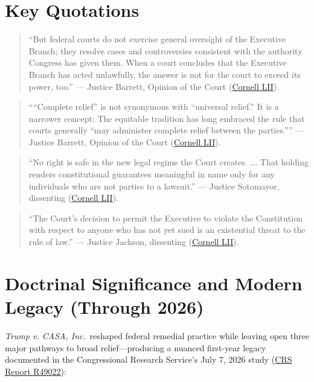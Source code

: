 \documentclass[12pt]{article}
\begin{document}
\section{Key Quotations}

\begin{quote}
``But federal courts do not exercise general oversight of the Executive Branch; they resolve cases and controversies consistent with the authority Congress has given them. When a court concludes that the Executive Branch has acted unlawfully, the answer is not for the court to exceed its power, too.'' --- Justice Barrett, Opinion of the Court (\href{https://www.law.cornell.edu/supremecourt/text/24A884}{Cornell LII}).
\end{quote}

\begin{quote}
````Complete relief'' is not synonymous with ``universal relief.'' It is a narrower concept: The equitable tradition has long embraced the rule that courts generally ``may administer complete relief between the parties.'''' --- Justice Barrett, Opinion of the Court (\href{https://www.law.cornell.edu/supremecourt/text/24A884}{Cornell LII}).
\end{quote}

\begin{quote}
``No right is safe in the new legal regime the Court creates. ... That holding renders constitutional guarantees meaningful in name only for any individuals who are not parties to a lawsuit.'' --- Justice Sotomayor, dissenting (\href{https://www.law.cornell.edu/supremecourt/text/24A884}{Cornell LII}).
\end{quote}

\begin{quote}
``The Court's decision to permit the Executive to violate the Constitution with respect to anyone who has not yet sued is an existential threat to the rule of law.'' --- Justice Jackson, dissenting (\href{https://www.law.cornell.edu/supremecourt/text/24A884}{Cornell LII}).
\end{quote}

\section{Doctrinal Significance and Modern Legacy (Through 2026)}

\textit{Trump v. CASA, Inc.}\ reshaped federal remedial practice while leaving open three major pathways to broad relief---producing a nuanced first-year legacy documented in the Congressional Research Service's July 7, 2026 study (\href{https://www.everycrsreport.com/reports/R49022.html}{CRS Report R49022}):
\end{document}
